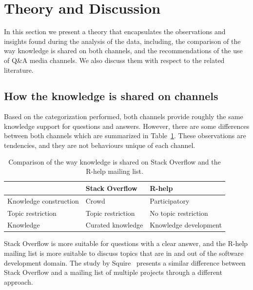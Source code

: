 \section{Theory and Discussion}
\label{cha:theory}

    In this section we present a theory that encapsulates the observations and insights found during the analysis of the data, including, the comparison of the way knowledge is shared on both channels, and the recommendations of the use of Q\&A media channels.
We also discuss them with respect to the related literature.

\subsection{How the knowledge is shared on channels}

    Based on the categorization performed, both channels provide roughly the same knowledge support for questions and answers.
    However, there are some differences between both channels which are summarized in Table~\ref{table:constrat}.
    These observations are tendencies, and they are not behaviours unique of each channel.

    \begin{table}[!htb]
      \centering
      \caption{Comparison of the way knowledge is shared on Stack Overflow and the R-help mailing list.}
      \label{table:constrat}
      \begin{small}
          \setlength{\tabcolsep}{5pt}
          \begin{tabular}{@{}lll@{}}
            \toprule
            \textbf{}      & \textbf{Stack Overflow} & \textbf{R-help}\\
            \midrule
            Knowledge construction & Crowd             & Participatory \\
            Topic restriction      & Topic restriction & No topic restriction \\
            Knowledge              & Curated knowledge & Knowledge development\\
            \bottomrule
          \end{tabular}
      \end{small}
    \end{table}

Stack Overflow is more suitable for questions with a clear answer, and the R-help mailing list is more suitable to discuss topics that are in and out of the software development domain.
The study by Squire~\cite{Squire2015a} presents a similar difference between Stack Overflow and a mailing list of multiple projects through a different approach.


